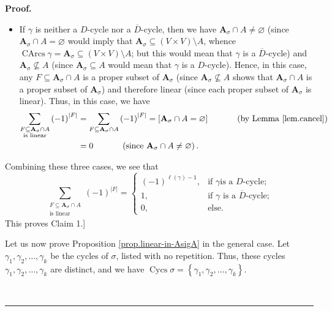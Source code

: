 \documentclass[numbers=enddot,12pt,final,onecolumn,notitlepage]{scrartcl}%
\numberwithin{exer}{section}
\theoremstyle{definition}
\newenvironment{proof}[1][Proof]{\noindent\textbf{#1.} }{\ \rule{0.5em}{0.5em}}
\let\sumnonlimits\sum
\renewcommand{\sum}{\sumnonlimits\limits}
\newenvironment{vershort}{}{}
\begin{document}
\begin{vershort}
\begin{proof}
\begin{itemize}
\item If $\gamma$ is neither a $D$-cycle nor a $\overline{D}$-cycle, then we
have $\mathbf{A}_{\sigma}\cap A\neq\varnothing$ (since $\mathbf{A}_{\sigma
}\cap A=\varnothing$ would imply that $\mathbf{A}_{\sigma}\subseteq\left(
V\times V\right)  \setminus A$, whence $\operatorname*{CArcs}\gamma
=\mathbf{A}_{\sigma}\subseteq\left(  V\times V\right)  \setminus A$; but this
would mean that $\gamma$ is a $\overline{D}$-cycle) and $\mathbf{A}_{\sigma
}\not \subseteq A$ (since $\mathbf{A}_{\sigma}\subseteq A$ would mean that
$\gamma$ is a $D$-cycle). Hence, in this case, any $F\subseteq\mathbf{A}%
_{\sigma}\cap A$ is a proper subset of $\mathbf{A}_{\sigma}$ (since
$\mathbf{A}_{\sigma}\not \subseteq A$ shows that $\mathbf{A}_{\sigma}\cap A$
is a proper subset of $\mathbf{A}_{\sigma}$) and therefore linear (since each
proper subset of $\mathbf{A}_{\sigma}$ is linear). Thus, in this case, we
have
\begin{align*}
\sum_{\substack{F\subseteq\mathbf{A}_{\sigma}\cap A\\\text{is linear}}}\left(
-1\right)  ^{\left\vert F\right\vert }  &  =\sum_{F\subseteq\mathbf{A}%
_{\sigma}\cap A}\left(  -1\right)  ^{\left\vert F\right\vert }=\left[
\mathbf{A}_{\sigma}\cap A=\varnothing\right]  \ \ \ \ \ \ \ \ \ \ \left(
\text{by Lemma \ref{lem.cancel}}\right) \\
&  =0\ \ \ \ \ \ \ \ \ \ \left(  \text{since }\mathbf{A}_{\sigma}\cap
A\neq\varnothing\right)  .
\end{align*}

\end{itemize}

Combining these three cases, we see that
\[
\sum_{\substack{F\subseteq\mathbf{A}_{\sigma}\cap A\\\text{is linear}}}\left(
-1\right)  ^{\left\vert F\right\vert }=%
\begin{cases}
\left(  -1\right)  ^{\ell\left(  \gamma\right)  -1}, & \text{if }\gamma\text{
is a }D\text{-cycle;}\\
1, & \text{if }\gamma\text{ is a }\overline{D}\text{-cycle;}\\
0, & \text{else.}%
\end{cases}
\]
This proves Claim 1.] \medskip

Let us now prove Proposition \ref{prop.linear-in-AsigA} in the general case.
Let $\gamma_{1},\gamma_{2},\ldots,\gamma_{k}$ be the cycles of $\sigma$,
listed with no repetition. Thus, these cycles $\gamma_{1},\gamma_{2}%
,\ldots,\gamma_{k}$ are distinct, and we have $\operatorname*{Cycs}%
\sigma=\left\{  \gamma_{1},\gamma_{2},\ldots,\gamma_{k}\right\}  $.


\end{proof}
\end{vershort}
\end{document}
